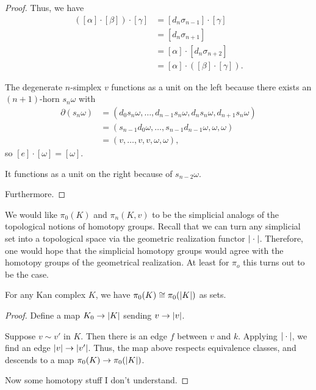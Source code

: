 \documentclass[main.tex]{subfiles}
\begin{document}
\begin{proof}
  Thus, we have
  \begin{align*}
    ([\alpha]\cdot[\beta])\cdot[\gamma] &= [d_{n}\sigma_{n-1}]\cdot[\gamma] \\
    &= [d_{n} \sigma_{n+1}] \\
    &= [\alpha] \cdot [d_{n}\sigma_{n+2}] \\
    &= [\alpha] \cdot ([\beta]\cdot[\gamma]).
  \end{align*}

  The degenerate $n$-simplex $v$ functions as a unit on the left because there exists an $(n+1)$-horn $s_{n}\omega$ with
  \begin{align*}
    \partial(s_{n}\omega) &= (d_{0}s_{n}\omega, \ldots, d_{n-1}s_{n}\omega, d_{n}s_{n}\omega, d_{n+1}s_{n}\omega) \\
    &=(s_{n-1}d_{0}\omega, \ldots, s_{n-1}d_{n-1}\omega, \omega, \omega) \\
    &= (v, \ldots, v, v, \omega, \omega),
  \end{align*}
  so $[e]\cdot[\omega] = [\omega]$. 

  It functions as a unit on the right because of $s_{n-2}\omega$.

  Furthermore.
\end{proof}

We would like $\pi_{0}(K)$ and $\pi_{n}(K, v)$ to be the simplicial analogs of the topological notions of homotopy groups. Recall that we can turn any simplicial set into a topological space via the geometric realization functor ${| \cdot |}$. Therefore, one would hope that the simplicial homotopy groups would agree with the homotopy groups of the geometrical realization. At least for $\pi_{o}$ this turns out to be the case.

\begin{theorem}
  For any Kan complex $K$, we have $\pi_{0}(K) \cong \pi_{0}({| K |})$ as sets.
\end{theorem}
\begin{proof}
  Define a map $K_{0} \to {| K |}$ sending $v \to {| v |}$.

  Suppose $v \sim v'$ in $K$. Then there is an edge $f$ between $v$ and $k$. Applying ${| \cdot |}$, we find an edge ${| v |} \to {| v' |}$. Thus, the map above respects equivalence classes, and descends to a map $\pi_{0}(K) \to \pi_{0}({| K |})$.

  Now some homotopy stuff I don't understand.
\end{proof}
\end{document}
